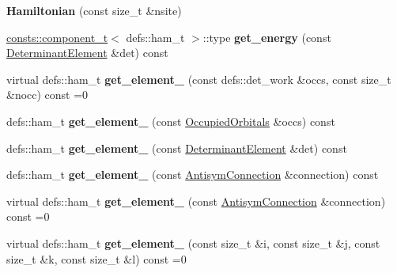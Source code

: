 \begin{DoxyCompactItemize}
\item 
{\bfseries Hamiltonian} (const size\+\_\+t \&nsite)\hypertarget{classHamiltonian_aea9fe1aef1bf9bd4799a2b957c550f02}{}\label{classHamiltonian_aea9fe1aef1bf9bd4799a2b957c550f02}

\item 
\hyperlink{structconsts_1_1component__t}{consts\+::component\+\_\+t}$<$ defs\+::ham\+\_\+t $>$\+::type {\bfseries get\+\_\+energy} (const \hyperlink{classDeterminantElement}{Determinant\+Element} \&det) const \hypertarget{classHamiltonian_aed8eb6473b1540bdde9960a73393145e}{}\label{classHamiltonian_aed8eb6473b1540bdde9960a73393145e}

\item 
virtual defs\+::ham\+\_\+t {\bfseries get\+\_\+element\+\_} (const defs\+::det\+\_\+work \&occs, const size\+\_\+t \&nocc) const =0\hypertarget{classHamiltonian_a1042c841212b35ea08b0714942134dec}{}\label{classHamiltonian_a1042c841212b35ea08b0714942134dec}

\item 
defs\+::ham\+\_\+t {\bfseries get\+\_\+element\+\_} (const \hyperlink{structOccupiedOrbitals}{Occupied\+Orbitals} \&occs) const \hypertarget{classHamiltonian_a2e830dc13526070bc9b22033e11f100e}{}\label{classHamiltonian_a2e830dc13526070bc9b22033e11f100e}

\item 
defs\+::ham\+\_\+t {\bfseries get\+\_\+element\+\_} (const \hyperlink{classDeterminantElement}{Determinant\+Element} \&det) const \hypertarget{classHamiltonian_af24779f187d68cadd31c38e63e242c0e}{}\label{classHamiltonian_af24779f187d68cadd31c38e63e242c0e}

\item 
defs\+::ham\+\_\+t {\bfseries get\+\_\+element\+\_} (const \hyperlink{classAntisymConnection}{Antisym\+Connection} \&connection) const \hypertarget{classHamiltonian_a762f62b1bac356730f0a2e126f911d6e}{}\label{classHamiltonian_a762f62b1bac356730f0a2e126f911d6e}

\item 
virtual defs\+::ham\+\_\+t {\bfseries get\+\_\+element\+\_} (const \hyperlink{classAntisymConnection}{Antisym\+Connection} \&connection) const =0\hypertarget{classHamiltonian_aa1d2b517a085e7fb0488bc2874f075fe}{}\label{classHamiltonian_aa1d2b517a085e7fb0488bc2874f075fe}

\item 
virtual defs\+::ham\+\_\+t {\bfseries get\+\_\+element\+\_} (const size\+\_\+t \&i, const size\+\_\+t \&j, const size\+\_\+t \&k, const size\+\_\+t \&l) const =0\hypertarget{classHamiltonian_a85cb450f38fb23fcf415c6799c1a661f}{}\label{classHamiltonian_a85cb450f38fb23fcf415c6799c1a661f}


\end{DoxyCompactItemize}
